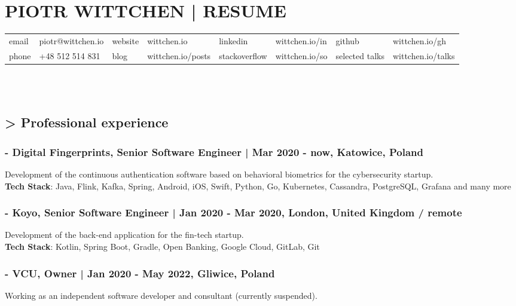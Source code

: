 \documentclass[8pt]{extarticle}
\begin{document}
  \small

  \section*{\large{PIOTR WITTCHEN | RESUME}}

  \begin{tabular}{llllllll}
      email  & piotr@wittchen.io & website  & wittchen.io       & linkedin      & wittchen.io/in & github         & wittchen.io/gh    \\
      phone  & +48 512 514 831   & blog     & wittchen.io/posts & stackoverflow & wittchen.io/so & selected talks & wittchen.io/talks \\
  \end{tabular} \\ \\

    \subsection*{\normalsize{> Professional experience}}

      \subsubsection*{\normalsize{- Digital Fingerprints, Senior Software Engineer | Mar 2020 - now, Katowice, Poland}}
      Development of the continuous authentication software based on behavioral biometrics for the cybersecurity startup.\\
      \textbf{Tech Stack}: Java, Flink, Kafka, Spring, Android, iOS, Swift, Python, Go, Kubernetes, Cassandra, PostgreSQL, Grafana and many more

      \subsubsection*{\normalsize{- Koyo, Senior Software Engineer | Jan 2020 - Mar 2020, London, United Kingdom / remote}}
      Development of the back-end application for the fin-tech startup.\\
      \textbf{Tech Stack}: Kotlin, Spring Boot, Gradle, Open Banking, Google Cloud, GitLab, Git

      \subsubsection*{\normalsize{- VCU, Owner | Jan 2020 - May 2022, Gliwice, Poland}}
      Working as an independent software developer and consultant (currently suspended).
\end{document}
